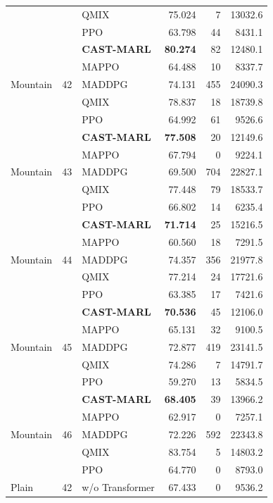 \begin{longtable}{lllrrr}
 &  & QMIX & 75.024 & 7 & 13032.6 \\
 &  & PPO & 63.798 & 44 & 8431.1 \\
\midrule
\multirow{5}{*}{Mountain} & \multirow{5}{*}{42} & \textbf{CAST-MARL} & \textbf{80.274} & 82 & 12480.1 \\
 &  & MAPPO & 64.488 & 10 & 8337.7 \\
 &  & MADDPG & 74.131 & 455 & 24090.3 \\
 &  & QMIX & 78.837 & 18 & 18739.8 \\
 &  & PPO & 64.992 & 61 & 9526.6 \\
\midrule
\multirow{5}{*}{Mountain} & \multirow{5}{*}{43} & \textbf{CAST-MARL} & \textbf{77.508} & 20 & 12149.6 \\
 &  & MAPPO & 67.794 & 0 & 9224.1 \\
 &  & MADDPG & 69.500 & 704 & 22827.1 \\
 &  & QMIX & 77.448 & 79 & 18533.7 \\
 &  & PPO & 66.802 & 14 & 6235.4 \\
\midrule
\multirow{5}{*}{Mountain} & \multirow{5}{*}{44} & \textbf{CAST-MARL} & \textbf{71.714} & 25 & 15216.5 \\
 &  & MAPPO & 60.560 & 18 & 7291.5 \\
 &  & MADDPG & 74.357 & 356 & 21977.8 \\
 &  & QMIX & 77.214 & 24 & 17721.6 \\
 &  & PPO & 63.385 & 17 & 7421.6 \\
\midrule
\multirow{5}{*}{Mountain} & \multirow{5}{*}{45} & \textbf{CAST-MARL} & \textbf{70.536} & 45 & 12106.0 \\
 &  & MAPPO & 65.131 & 32 & 9100.5 \\
 &  & MADDPG & 72.877 & 419 & 23141.5 \\
 &  & QMIX & 74.286 & 7 & 14791.7 \\
 &  & PPO & 59.270 & 13 & 5834.5 \\
\midrule
\multirow{5}{*}{Mountain} & \multirow{5}{*}{46} & \textbf{CAST-MARL} & \textbf{68.405} & 39 & 13966.2 \\
 &  & MAPPO & 62.917 & 0 & 7257.1 \\
 &  & MADDPG & 72.226 & 592 & 22343.8 \\
 &  & QMIX & 83.754 & 5 & 14803.2 \\
 &  & PPO & 64.770 & 0 & 8793.0 \\
\midrule
\multirow{4}{*}{Plain} & \multirow{4}{*}{42} & w/o Transformer & 67.433 & 0 & 9536.2 \\

\end{longtable}
